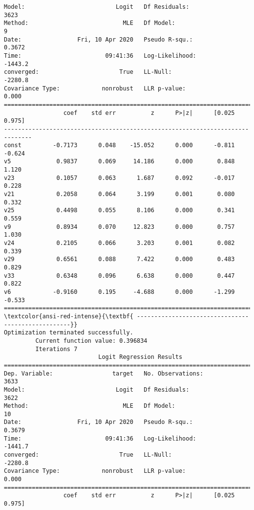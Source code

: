 \documentclass[11pt]{article}
\begin{document}
\begin{Verbatim}[commandchars=\\\{\}]
Model:                          Logit   Df Residuals:                     3623
Method:                           MLE   Df Model:                            9
Date:                Fri, 10 Apr 2020   Pseudo R-squ.:                  0.3672
Time:                        09:41:36   Log-Likelihood:                -1443.2
converged:                       True   LL-Null:                       -2280.8
Covariance Type:            nonrobust   LLR p-value:                     0.000
==============================================================================
                 coef    std err          z      P>|z|      [0.025      0.975]
------------------------------------------------------------------------------
const         -0.7173      0.048    -15.052      0.000      -0.811      -0.624
v5             0.9837      0.069     14.186      0.000       0.848       1.120
v23            0.1057      0.063      1.687      0.092      -0.017       0.228
v21            0.2058      0.064      3.199      0.001       0.080       0.332
v25            0.4498      0.055      8.106      0.000       0.341       0.559
v9             0.8934      0.070     12.823      0.000       0.757       1.030
v24            0.2105      0.066      3.203      0.001       0.082       0.339
v29            0.6561      0.088      7.422      0.000       0.483       0.829
v33            0.6348      0.096      6.638      0.000       0.447       0.822
v6            -0.9160      0.195     -4.688      0.000      -1.299      -0.533
==============================================================================
\textcolor{ansi-red-intense}{\textbf{ ---------------------------------------------------}}
Optimization terminated successfully.
         Current function value: 0.396834
         Iterations 7
                           Logit Regression Results                           
==============================================================================
Dep. Variable:                 target   No. Observations:                 3633
Model:                          Logit   Df Residuals:                     3622
Method:                           MLE   Df Model:                           10
Date:                Fri, 10 Apr 2020   Pseudo R-squ.:                  0.3679
Time:                        09:41:36   Log-Likelihood:                -1441.7
converged:                       True   LL-Null:                       -2280.8
Covariance Type:            nonrobust   LLR p-value:                     0.000
==============================================================================
                 coef    std err          z      P>|z|      [0.025      0.975]

\end{Verbatim}
\end{document}
